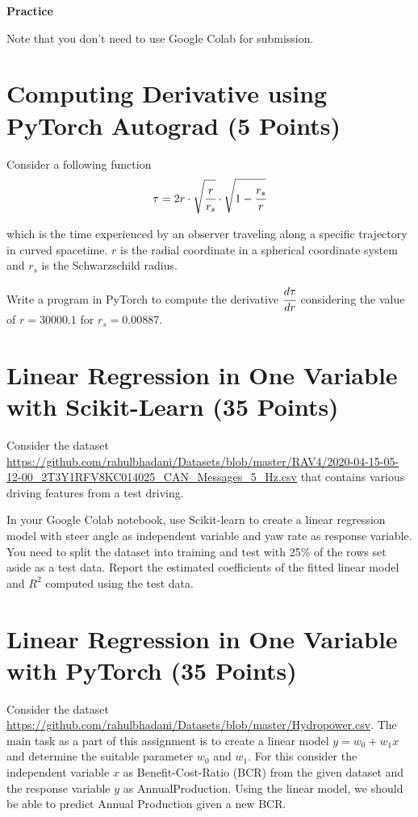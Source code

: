 \documentclass[12pt, xcolor=dvipsnames,svgnames,x11names]{article}
\makeatletter
\newenvironment{multiequation}[1][]{%
\begin{equation}%
   \begin{aligned}%
   \ifx#1\@empty\else\label{#1}\fi%
}{%
   \end{aligned}%
\end{equation}%
}
\makeatother
\begin{document}
\bigskip

\bigskip

{{\LARGE \textbf{Practice}}}

Note that you don't need to use Google Colab for submission.

\section{Computing Derivative  using PyTorch Autograd (5 Points)}

Consider a following function
\begin{multiequation}
  \tau  = 2 r \cdot \sqrt{\cfrac{r}{r_s}} \cdot \sqrt{1 - \cfrac{r_s}{r}}
\end{multiequation}

which is the time experienced by an observer traveling along a specific trajectory in curved spacetime. $r$ is  the radial coordinate in a spherical coordinate system and $r_s$ is the Schwarzschild radius.

Write a program in PyTorch to compute the derivative $\cfrac{d\tau}{dr}$ considering the value of $r = 30000.1$  for $r_s = 0.00887$.
  
\section{Linear Regression in One Variable with Scikit-Learn (35 Points)}


Consider the dataset \url{https://github.com/rahulbhadani/Datasets/blob/master/RAV4/2020-04-15-05-12-00_2T3Y1RFV8KC014025_CAN_Messages_5_Hz.csv} that contains various driving features from a test driving.

In your Google Colab notebook, use Scikit-learn to create a linear regression model with steer angle as independent  variable and yaw rate as response variable. You need to split the dataset into training and test with 25\% of the rows set aside as a test data. Report the estimated coefficients of the fitted linear model and $R^2$ computed using the test data.



\section{Linear Regression in One Variable with PyTorch (35 Points)}

Consider the dataset \url{https://github.com/rahulbhadani/Datasets/blob/master/Hydropower.csv}. The main task as a part of this assignment is to create a linear model $y  = w_0 + w_1 x$ and determine the suitable parameter $w_0$ and $w_1$.  For this consider the independent variable $x$ as Benefit-Cost-Ratio (BCR) from the given dataset and the response variable $y$ as AnnualProduction. Using the linear model, we should be able to predict Annual Production given a new BCR.
\end{document}

